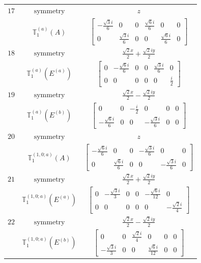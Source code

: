 \documentclass[fleqn,8pt,landscape]{jsarticle}
\begin{document}
\begin{longtable}{ccc}
$ 17 $ & $ \text{symmetry} $ & $ z $ \\
$  $ & $ \mathbb{T}_{1}^{(a)}(A) $ & $ \begin{bmatrix} - \frac{\sqrt{3} i}{6} & 0 & 0 & \frac{\sqrt{6} i}{6} & 0 & 0 \\ 0 & \frac{\sqrt{3} i}{6} & 0 & 0 & \frac{\sqrt{6} i}{6} & 0 \end{bmatrix} $ \\ \hline
$ 18 $ & $ \text{symmetry} $ & $ \frac{\sqrt{2} x}{2} + \frac{\sqrt{2} i y}{2} $ \\
$  $ & $ \mathbb{T}_{1}^{(a)}(E^{(a)}) $ & $ \begin{bmatrix} 0 & - \frac{\sqrt{6} i}{6} & 0 & 0 & \frac{\sqrt{3} i}{6} & 0 \\ 0 & 0 & 0 & 0 & 0 & \frac{i}{2} \end{bmatrix} $ \\ \hline
$ 19 $ & $ \text{symmetry} $ & $ \frac{\sqrt{2} x}{2} - \frac{\sqrt{2} i y}{2} $ \\
$  $ & $ \mathbb{T}_{1}^{(a)}(E^{(b)}) $ & $ \begin{bmatrix} 0 & 0 & - \frac{i}{2} & 0 & 0 & 0 \\ - \frac{\sqrt{6} i}{6} & 0 & 0 & - \frac{\sqrt{3} i}{6} & 0 & 0 \end{bmatrix} $ \\ \hline
$ 20 $ & $ \text{symmetry} $ & $ z $ \\
$  $ & $ \mathbb{T}_{1}^{(1,0;a)}(A) $ & $ \begin{bmatrix} - \frac{\sqrt{6} i}{6} & 0 & 0 & - \frac{\sqrt{3} i}{6} & 0 & 0 \\ 0 & \frac{\sqrt{6} i}{6} & 0 & 0 & - \frac{\sqrt{3} i}{6} & 0 \end{bmatrix} $ \\ \hline
$ 21 $ & $ \text{symmetry} $ & $ \frac{\sqrt{2} x}{2} + \frac{\sqrt{2} i y}{2} $ \\
$  $ & $ \mathbb{T}_{1}^{(1,0;a)}(E^{(a)}) $ & $ \begin{bmatrix} 0 & - \frac{\sqrt{3} i}{3} & 0 & 0 & - \frac{\sqrt{6} i}{12} & 0 \\ 0 & 0 & 0 & 0 & 0 & - \frac{\sqrt{2} i}{4} \end{bmatrix} $ \\ \hline
$ 22 $ & $ \text{symmetry} $ & $ \frac{\sqrt{2} x}{2} - \frac{\sqrt{2} i y}{2} $ \\
$  $ & $ \mathbb{T}_{1}^{(1,0;a)}(E^{(b)}) $ & $ \begin{bmatrix} 0 & 0 & \frac{\sqrt{2} i}{4} & 0 & 0 & 0 \\ - \frac{\sqrt{3} i}{3} & 0 & 0 & \frac{\sqrt{6} i}{12} & 0 & 0 \end{bmatrix} $ \\ \hline

\end{longtable}
\end{document}
